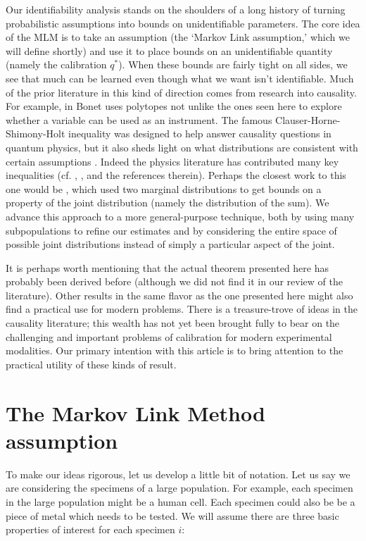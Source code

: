 Our identifiability analysis stands on the shoulders of a long history of turning probabilistic assumptions into bounds on unidentifiable parameters.  The core idea of the MLM is to take an assumption (the `Markov Link assumption,' which we will define shortly) and use it to place bounds on an unidentifiable quantity (namely the calibration $q^*$).  When these bounds are fairly tight on all sides, we see that much can be learned even though what we want isn't identifiable.  Much of the prior literature in this kind of direction comes from research into causality.  For example, in \cite{bonet2001instrumentality} Bonet uses polytopes not unlike the ones seen here to explore whether a variable can be used as an instrument.  The famous Clauser-Horne-Shimony-Holt inequality was designed to help answer causality questions in quantum physics, but it also sheds light on what distributions are consistent with certain assumptions \cite{clauser1969proposed}.  Indeed the physics literature has contributed many key inequalities (cf. \cite{chaves2014inferring}, \cite{kela2017semidefinite}, and the references therein).  Perhaps the closest work to this one would be \cite{makarov1982estimates}, which used two marginal distributions to get bounds on a property of the joint distribution (namely the distribution of the sum).  We advance this approach to a more general-purpose technique, both by using many subpopulations to refine our estimates and by considering the entire space of possible joint distributions instead of simply a particular aspect of the joint.  

It is perhaps worth mentioning that the actual theorem presented here has probably been derived before (although we did not find it in our review of the literature).  Other results in the same flavor as the one presented here might also find a practical use for modern problems.  There is a treasure-trove of ideas in the causality literature; this wealth has not yet been brought fully to bear on the challenging and important problems of calibration for modern experimental modalities.  Our primary intention with this article is to bring attention to the practical utility of these kinds of result.

\section{The Markov Link Method assumption}

To make our ideas rigorous, let us develop a little bit of notation.  Let us say we are considering the specimens of a large population.  For example, each specimen in the large population might be a human cell.  Each specimen could also be be a piece of metal which needs to be tested.  We will assume there are three basic properties of interest for each specimen $i$:

